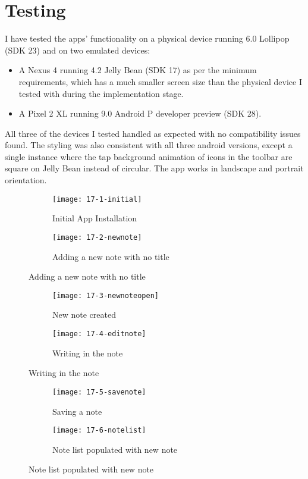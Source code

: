 \chapter{Testing}
\graphicspath{{4-testing/images/}}

I have tested the apps' functionality on a physical device running 6.0 Lollipop (SDK 23) and on two emulated devices:

\begin{itemize}
  \item A Nexus 4 running 4.2 Jelly Bean (SDK 17) as per the minimum requirements, which has a much smaller screen size than the physical device I tested with during the implementation stage.
  \item A Pixel 2 XL running 9.0 Android P developer preview (SDK 28).
\end{itemize}

All three of the devices I tested handled as expected with no compatibility issues found. The styling was also consistent with all three android versions, except a single instance where the tap background animation of icons in the toolbar are square on Jelly Bean instead of circular. The app works in landscape and portrait orientation.

\begin{figure}[H]
  \begin{subfigure}{.5\textwidth}
    \caption{Initial App Installation}
    \centering
    \texttt{[image: 17-1-initial]}
  \end{subfigure}
  \begin{subfigure}{.5\textwidth}
    \caption{Adding a new note with no title}
    \centering
    \texttt{[image: 17-2-newnote]}
  \end{subfigure}
\end{figure}

\begin{figure}[H]
  \begin{subfigure}{.5\textwidth}
    \caption{New note created}
    \centering
    \texttt{[image: 17-3-newnoteopen]}
  \end{subfigure}
  \begin{subfigure}{.5\textwidth}
    \caption{Writing in the note}
    \centering
    \texttt{[image: 17-4-editnote]}
  \end{subfigure}
\end{figure}

\begin{figure}[H]
  \begin{subfigure}{.5\textwidth}
    \caption{Saving a note}
    \centering
    \texttt{[image: 17-5-savenote]}
  \end{subfigure}
  \begin{subfigure}{.5\textwidth}
    \caption{Note list populated with new note}
    \centering
    \texttt{[image: 17-6-notelist]}
  \end{subfigure}
\end{figure}

